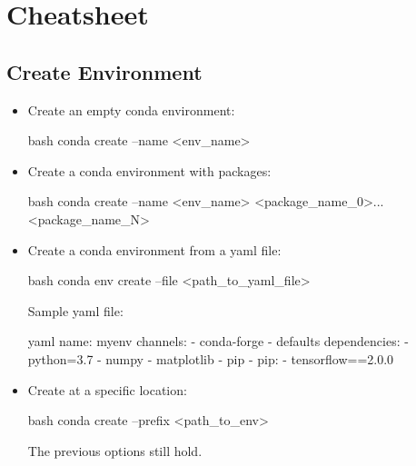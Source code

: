 \section{ Cheatsheet}


\subsection{Create Environment}

\begin{itemize}
    \item Create an empty conda environment:
    \begin{mintedbox}{bash}
conda create --name <env_name>
    \end{mintedbox}
    \item Create a conda environment with packages:
    \begin{mintedbox}{bash}
conda create --name <env_name> <package_name_0>...<package_name_N>
    \end{mintedbox}
    \item Create a conda environment from a yaml file:
    \begin{mintedbox}{bash}
conda env create --file <path_to_yaml_file>
    \end{mintedbox}
    Sample yaml file:
    \begin{mintedbox}{yaml}
name: myenv
channels:
    - conda-forge
    - defaults
dependencies:
    - python=3.7
    - numpy
    - matplotlib
    - pip
    - pip:
        - tensorflow==2.0.0
    \end{mintedbox}
    \item Create at a specific location:
    \begin{mintedbox}{bash}
conda create --prefix <path_to_env>
    \end{mintedbox}
    The previous options still hold.
\end{itemize}



